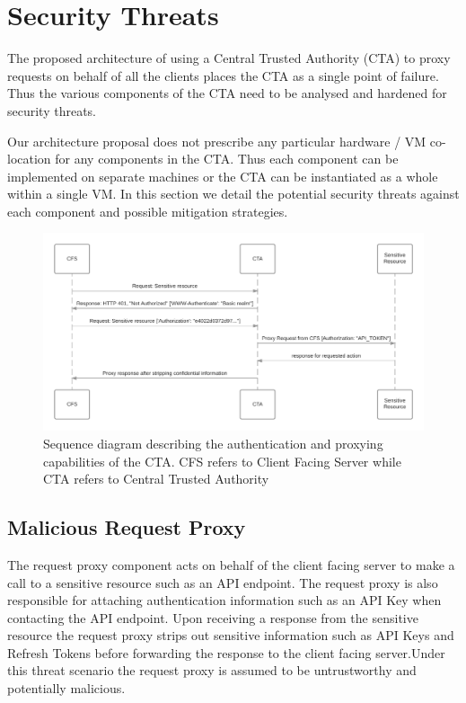 \documentclass{sig-alternate-05-2015}
\begin{document}
\section*{Security Threats}

The proposed architecture of using a Central Trusted Authority (CTA) to proxy requests on behalf of all the clients places the CTA as a single point of failure. Thus the various components of the CTA need to be analysed and hardened for security threats. 

Our architecture proposal does not prescribe any particular hardware / VM co-location for any components in the CTA. Thus each component can be implemented on separate machines or the CTA can be instantiated as a whole within a single VM. In this section we detail the potential security threats against each component and possible mitigation strategies.

\begin{figure}[!ht]
  \centering
  \includegraphics[keepaspectratio=true,scale=0.2]{sequence_diagram}
  \caption{Sequence diagram describing the authentication and proxying capabilities of the CTA. CFS refers to Client Facing Server while CTA refers to Central Trusted Authority}
  \label{fig:ctaarchitecture}
\end{figure}
\subsection*{Malicious Request Proxy}

The request proxy component acts on behalf of the client facing server to make a call to a sensitive resource such as an API endpoint. The request proxy is also responsible for attaching authentication information such as an API Key when contacting the API endpoint. Upon receiving a response from the sensitive resource the request proxy strips out sensitive information such as API Keys and Refresh Tokens before forwarding the response to the client facing server.Under this threat scenario the request proxy is assumed to be untrustworthy and potentially malicious.
\end{document}
